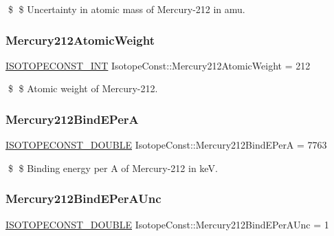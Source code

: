 \$ \$ Uncertainty in atomic mass of Mercury-\/212 in amu. \mbox{\label{group___isotope_const-_mercury-_hg212_ga620a5d9b1ddd705bcfd08218ae07a5f1}} 
\subsubsection{\texorpdfstring{Mercury212\+Atomic\+Weight}{Mercury212AtomicWeight}}
{\footnotesize\ttfamily \mbox{\hyperlink{group___isotope_const-_macros_ga5f18360b3e99483a35c32d789e62621c}{I\+S\+O\+T\+O\+P\+E\+C\+O\+N\+S\+T\+\_\+\+I\+NT}} Isotope\+Const\+::\+Mercury212\+Atomic\+Weight = 212}

\$ \$ Atomic weight of Mercury-\/212. \mbox{\label{group___isotope_const-_mercury-_hg212_ga5d5b4bfe6582fefb37a80074b8f71411}} 
\subsubsection{\texorpdfstring{Mercury212\+Bind\+E\+PerA}{Mercury212BindEPerA}}
{\footnotesize\ttfamily \mbox{\hyperlink{group___isotope_const-_macros_ga8f45a7272ce02c0b4c65c44636ed719a}{I\+S\+O\+T\+O\+P\+E\+C\+O\+N\+S\+T\+\_\+\+D\+O\+U\+B\+LE}} Isotope\+Const\+::\+Mercury212\+Bind\+E\+PerA = 7763}

\$ \$ Binding energy per A of Mercury-\/212 in keV. \mbox{\label{group___isotope_const-_mercury-_hg212_gaa5c2f914260af358447133b081b263f5}} 
\subsubsection{\texorpdfstring{Mercury212\+Bind\+E\+Per\+A\+Unc}{Mercury212BindEPerAUnc}}
{\footnotesize\ttfamily \mbox{\hyperlink{group___isotope_const-_macros_ga8f45a7272ce02c0b4c65c44636ed719a}{I\+S\+O\+T\+O\+P\+E\+C\+O\+N\+S\+T\+\_\+\+D\+O\+U\+B\+LE}} Isotope\+Const\+::\+Mercury212\+Bind\+E\+Per\+A\+Unc = 1}

